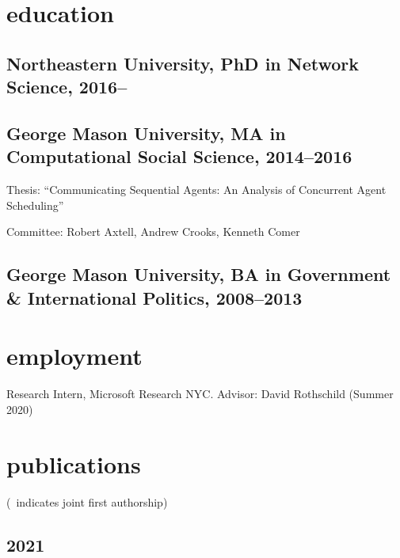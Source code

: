 \documentclass[11pt, letter]{article}
\title{}
\begin{document}
\maketitle

\section{education}
\subsection{Northeastern University, PhD in Network Science, 2016--}
\subsection{George Mason University, MA in Computational Social Science,
  2014--2016}
Thesis: ``Communicating Sequential Agents: An Analysis of Concurrent Agent
Scheduling''

Committee: Robert Axtell, Andrew Crooks, Kenneth Comer
\subsection{George Mason University, BA in Government \& International Politics,
  2008--2013}
\vspace{2mm}
\section{employment}
Research Intern, Microsoft Research NYC. Advisor: David Rothschild (Summer 2020)
\vspace{-1mm}

\section{publications}

\vspace{1mm} {\footnotesize (\textdagger\, indicates joint first authorship)}
\subsection*{}
\subsection{2021}
\end{document}
